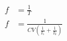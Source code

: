 \documentclass[12pt]{article}
\begin{document}
\begin{align*}
f &= \frac{1}{T}\\
f &= \frac{1}{CV \left( \frac{1}{I_1} + \frac{1}{I_2} \right)}
\end{align*}
\end{document}
